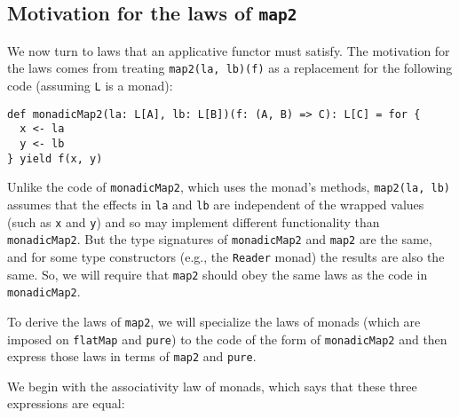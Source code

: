 \subsection{Motivation for the laws of \texttt{map2}\label{subsec:Motivation-for-the-laws-of-map2}}

We now turn to laws that an applicative functor must satisfy. The
motivation for the laws comes from treating \lstinline!map2(la, lb)(f)!
as a replacement for the following code (assuming \lstinline!L! is
a monad):
\begin{lstlisting}
def monadicMap2(la: L[A], lb: L[B])(f: (A, B) => C): L[C] = for {
  x <- la
  y <- lb
} yield f(x, y)
\end{lstlisting}
Unlike the code of \lstinline!monadicMap2!, which uses the monad\textsf{'}s
methods, \lstinline!map2(la, lb)! assumes that the effects in \lstinline!la!
and \lstinline!lb! are independent of the wrapped values (such as
\lstinline!x! and \lstinline!y!) and so may implement different
functionality than \lstinline!monadicMap2!. But the type signatures
of \lstinline!monadicMap2! and \lstinline!map2! are the same, and
for some type constructors (e.g., the \lstinline!Reader! monad) the
results are also the same. So, we will require that \lstinline!map2!
should obey the same laws as the code in \lstinline!monadicMap2!.

To derive the laws of \lstinline!map2!, we will specialize the laws
of monads (which are imposed on \lstinline!flatMap! and \lstinline!pure!)
to the code of the form of \lstinline!monadicMap2! and then express
those laws in terms of \lstinline!map2! and \lstinline!pure!.

We begin with the associativity law of monads, which says that these
three expressions are equal:

\vspace{0.2\baselineskip}

